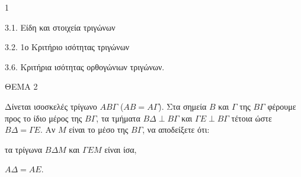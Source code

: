 \begin{ylh}{1}
    \item 3.1. Είδη και στοιχεία τριγώνων
    \item 3.2. 1ο Κριτήριο ισότητας τριγώνων
    \item 3.6. Κριτήρια ισότητας ορθογώνιων τριγώνων.
\end{ylh}

ΘΕΜΑ 2

Δίνεται ισοσκελές τρίγωνο $ΑΒ\Gamma$ ($ΑΒ=Α\Gamma$). Στα σημεία $Β$ και $\Gamma$ της $B\Gamma$ φέρουμε προς το ίδιο μέρος της $B\Gamma$, τα τμήματα $Β\Delta \perp B\Gamma$ και $\Gamma E \perp B\Gamma$ τέτοια ώστε $Β\Delta = \Gamma E$. Αν $M$ είναι το μέσο της $B\Gamma$, να αποδείξετε ότι:

\begin{alist}
\item τα τρίγωνα $B\Delta M$ και $\Gamma EM$ είναι ίσα, 
\item $A\Delta = AE$. 

\begin{center}
\end{center}
\end{alist}
